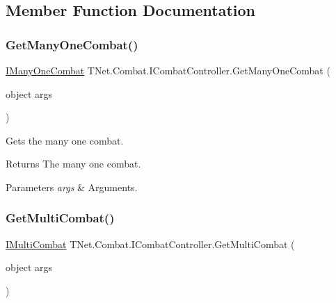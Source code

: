 \subsection{Member Function Documentation}
\mbox{\label{interface_t_net_1_1_combat_1_1_i_combat_controller_a1fb4ab877d18c06278fbab91f5a72cda}} 
\subsubsection{\texorpdfstring{Get\+Many\+One\+Combat()}{GetManyOneCombat()}}
{\footnotesize\ttfamily \mbox{\hyperlink{interface_t_net_1_1_combat_1_1_i_many_one_combat}{I\+Many\+One\+Combat}} T\+Net.\+Combat.\+I\+Combat\+Controller.\+Get\+Many\+One\+Combat (\begin{DoxyParamCaption}\item[{object}]{args }\end{DoxyParamCaption})}



Gets the many one combat. 

\begin{DoxyReturn}{Returns}
The many one combat.
\end{DoxyReturn}

\begin{DoxyParams}{Parameters}
{\em args} & Arguments.\\
\hline
\end{DoxyParams}
\mbox{\label{interface_t_net_1_1_combat_1_1_i_combat_controller_a76039d2745233b5dfc24c58b59332cfb}} 
\subsubsection{\texorpdfstring{Get\+Multi\+Combat()}{GetMultiCombat()}}
{\footnotesize\ttfamily \mbox{\hyperlink{interface_t_net_1_1_combat_1_1_i_multi_combat}{I\+Multi\+Combat}} T\+Net.\+Combat.\+I\+Combat\+Controller.\+Get\+Multi\+Combat (\begin{DoxyParamCaption}\item[{object}]{args }\end{DoxyParamCaption})}



